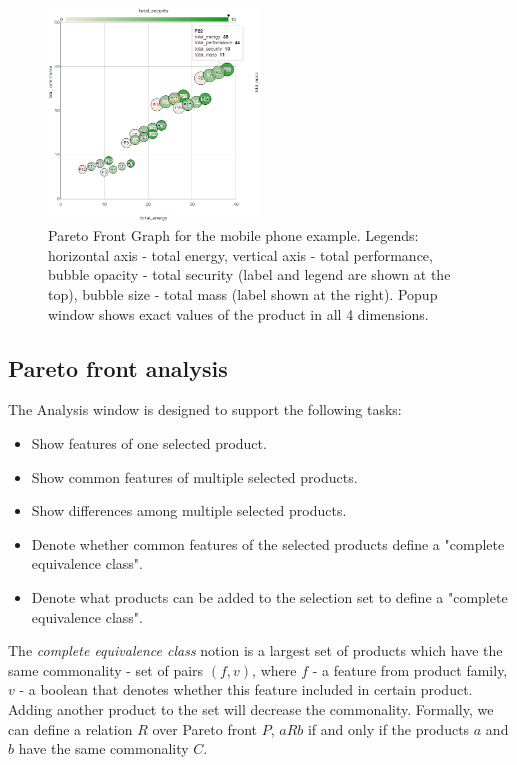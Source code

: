 \documentclass{acm_proc_article-sp}
\begin{document}
\begin{figure}[h]
\includegraphics[width=0.5\textwidth]{graph.png}
\caption{Pareto Front Graph for the mobile phone example. Legends: horizontal axis -  total energy, vertical axis - total performance, bubble opacity - total security (label and legend are shown at the top),  bubble size - total mass (label shown at the right). Popup window shows exact values of the product in all 4 dimensions.}    
  \label{fig:graph}
\end{figure}

\subsection{Pareto front analysis}

The Analysis window is designed to support the following tasks:
\begin{itemize}
\item Show features of one selected product.
\item Show common features of multiple selected products.
\item Show differences among multiple selected products.
\item Denote whether common features of the selected products define a "complete equivalence class".
\item Denote what products can be added to the selection set to define a "complete equivalence class".
\end{itemize}

The \textit{complete equivalence class} notion is a largest set of products which have the same commonality - set of pairs $(f, v)$, where $f$ - a feature from product family, $v$ - a boolean that denotes whether this feature included in certain product. Adding another product to the set will decrease the commonality. Formally, we can define a relation $R$ over Pareto front $P$, $aRb$ if and only if the products $a$ and $b$ have the same commonality $C$.
\end{document}
